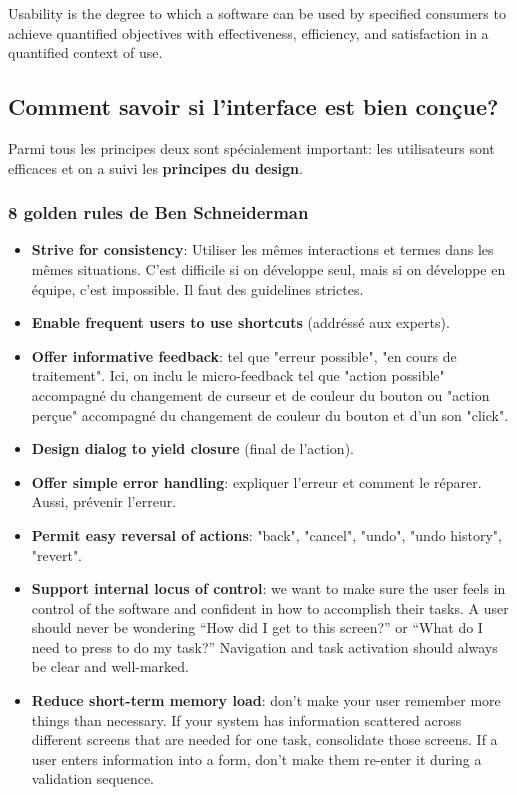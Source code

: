 Usability is the degree to which a software can be used by specified consumers to achieve quantified objectives with effectiveness, efficiency, and satisfaction in a quantified context of use.

\subsection{Comment savoir si l'interface est bien con\c{c}ue?}

Parmi tous les principes deux sont sp\'ecialement important: les utilisateurs sont efficaces et on a suivi les \textbf{principes du design}.

\subsubsection{8 golden rules de Ben Schneiderman}
\begin{itemize}
\item \textbf{Strive for consistency}: Utiliser les m\^emes interactions et termes dans les m\^emes situations. C'est difficile si on d\'eveloppe seul, mais si on d\'eveloppe en \'equipe, c'est impossible. Il faut des guidelines strictes.
\item \textbf{Enable frequent users to use shortcuts} (addr\'ess\'e aux experts).
\item \textbf{Offer informative feedback}: tel que "erreur possible", "en cours de traitement". Ici, on inclu le micro-feedback tel que "action possible" accompagn\'e du changement de curseur et de couleur du bouton ou "action per\c{c}ue" accompagn\'e du changement de couleur du bouton et d'un son "click".
\item \textbf{Design dialog to yield closure} (final de l'action).
\item \textbf{Offer simple error handling}: expliquer l'erreur et comment le r\'eparer. Aussi, pr\'evenir l'erreur.
\item \textbf{Permit easy reversal of actions}: "back", "cancel", "undo", "undo history", "revert".
\item \textbf{Support internal locus of control}: we want to make sure the user feels in control of the software and confident in how to accomplish their tasks.  A user should never be wondering “How did I get to this screen?” or “What do I need to press to do my task?” Navigation and task activation should always be clear and well-marked.
\item \textbf{Reduce short-term memory load}: don’t make your user remember more things than necessary.  If your system has information scattered across different screens that are needed for one task, consolidate those screens.  If a user enters information into a form, don’t make them re-enter it during a validation sequence.
\end{itemize}

